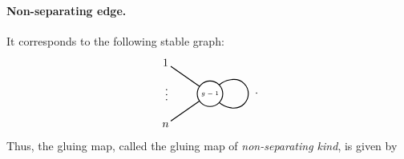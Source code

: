 \documentclass[11pt,reqno]{amsart}
\numberwithin{equation}{section}
\theoremstyle{plain}
\theoremstyle{definition}
\begin{document}
\paragraph{Non-separating edge.}
It corresponds to the following stable graph:
\begin{equation}
  \begin{tikzpicture}[baseline]
    \draw[thick] (0,0) -- (145:1.5);
    \node at (145:1.7) {$1$};
    \node[rotate=90] at (180:1.35) {$\cdots$};
    \draw[thick] (0,0) -- (-145:1.5);
    \node at (-145:1.7) {$n$};
    
    \draw[thick,rotate=-90] (0,0) to[out=45,in=-90] (.45,.75) to[out=90,in=0] (0,1.2) to[out=180,in=90] (-.45,.75) to[out=-90,in=135] (0,0);

    \draw[thick,fill=white] (0,0) circle[radius=.4cm];
    \node at (0,0) {\tiny$g-1$};
  \end{tikzpicture}
  \;\;.
\end{equation}
Thus, the gluing map, called the gluing map of \emph{non-separating kind}, is given by
\end{document}
